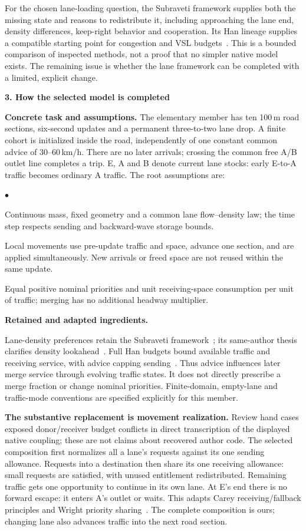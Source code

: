 \documentclass[10pt,a4paper]{article}
\newcommand{\head}[1]{\par\vspace{5pt}\noindent\textbf{#1}\par\nobreak\vspace{1pt}}
\newenvironment{points}{\begin{list}{$\bullet$}{%
 \setlength{\leftmargin}{1.3em}\setlength{\labelwidth}{0.6em}%
 \setlength{\labelsep}{0.4em}\setlength{\itemsep}{2pt}%
 \setlength{\parsep}{0pt}\setlength{\topsep}{2pt}}}{\end{list}}
\begin{document}
For the chosen lane-loading question, the Subraveti framework supplies both
the missing state and reasons to redistribute it, including approaching the
lane end, density differences, keep-right behavior and cooperation. Its
Han lineage supplies a compatible starting point for congestion and VSL
budgets~\cite{han16,han17}. This is a bounded comparison of inspected methods,
not a proof that no simpler native model exists. The remaining issue is
whether the lane framework can be completed with a limited, explicit change.

\newpage
\head{3. How the selected model is completed}
\textbf{Concrete task and assumptions.}
The elementary member has ten 100\,m road sections, six-second updates and a
permanent three-to-two lane drop. A finite cohort is initialized inside the
road, independently of one constant common advice of 30--60\,km/h. There
are no later arrivals; crossing the common free A/B outlet line completes
a trip. E, A and B denote current lane stocks: early E-to-A traffic becomes
ordinary A traffic. The root assumptions are:
\begin{points}
\item Continuous mass, fixed geometry and a common lane flow--density law;
the time step respects sending and backward-wave storage bounds.
\item Local movements use pre-update traffic and space, advance one section,
and are applied simultaneously. New arrivals or freed space are not reused
within the same update.
\item Equal positive nominal priorities and unit receiving-space consumption
per unit of traffic; merging has no additional headway multiplier.
\end{points}

\textbf{Retained and adapted ingredients.}\par
Lane-density preferences retain the Subraveti framework~\cite{ns}; its
same-author thesis clarifies density lookahead~\cite{thesis}. Full Han
budgets bound available traffic and receiving service, with advice capping
sending~\cite{han16,han17}. Thus advice influences later merge service
through evolving traffic states. It does not directly prescribe a merge
fraction or change nominal priorities. Finite-domain, empty-lane and traffic-mode
conventions are specified explicitly for this member.

\textbf{The substantive replacement is movement realization.}
Review hand cases exposed donor/receiver budget conflicts in direct
transcription of the displayed native coupling; these are not claims about
recovered author code. The selected composition first normalizes all a lane's
requests against its one sending allowance. Requests into a destination
then share its one receiving allowance: small requests are satisfied, with
unused entitlement redistributed. Remaining traffic gets one opportunity
to continue in its own lane. At E's end there is no forward escape: it
enters A's outlet or waits. This adapts Carey receiving/fallback principles
and Wright priority sharing~\cite{carey,wright}. The complete composition is
ours; changing lane also advances traffic into the next road section.
\end{document}
